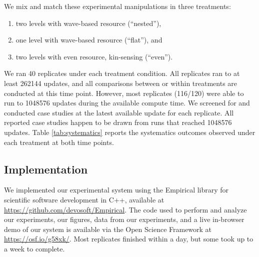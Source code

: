 We mix and match these experimental manipulations in three treatments:
\begin{enumerate}
\item two levels with wave-based resource (``nested''),
\item one level with wave-based resource (``flat''), and
\item two levels with even resource, kin-sensing (``even'').
\end{enumerate}

We ran 40 replicates under each treatment condition.
All replicates ran to at least 262144 updates, and all comparisons between or within treatments are conducted at this time point.
However, most replicates (116/120) were able to run to 1048576 updates during the available compute time.
We screened for and conducted case studies at the latest available update for each replicate.
All reported case studies happen to be drawn from runs that reached 1048576 updates.
Table \ref{tab:systematics} reports the systematics outcomes observed under each treatment at both time points.

\subsection{Implementation}

We implemented our experimental system using the Empirical library for scientific software development in C++, available at \url{https://github.com/devosoft/Empirical}.
The code used to perform and analyze our experiments, our figures, data from our experiments, and a live in-browser demo of our system is available via the Open Science Framework at \url{https://osf.io/g58xk/}.
Most replicates finished within a day, but some took up to a week to complete.
